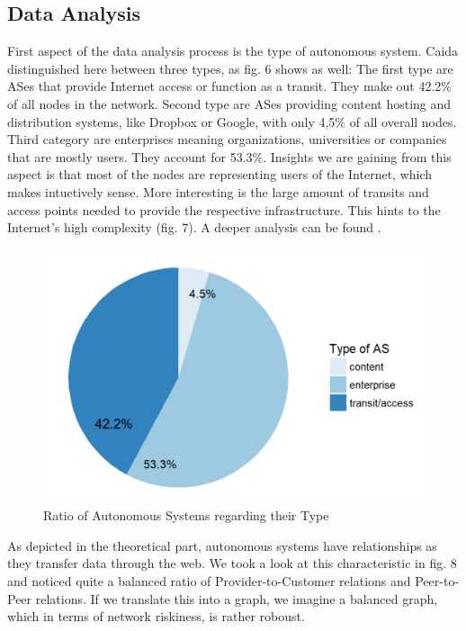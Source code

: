 \documentclass[conference, 11pt]{IEEEtran}
\begin{document}
\subsection{Data Analysis}
First aspect of the data analysis process is the type of autonomous system. Caida distinguished here between three types, as fig. 6 shows as well: The first type are ASes that provide Internet access or function as a transit. They make out 42.2\% of all nodes in the network. Second type are ASes providing content hosting and distribution systems, like Dropbox or Google, with only 4,5\% of all overall nodes. Third category are enterprises meaning organizations, universities or companies that are mostly users. They account for 53.3\%. Insights we are gaining from this aspect is that most of the nodes are representing users of the Internet, which makes intuetively sense. More interesting is the large amount of transits and access points needed to provide the respective infrastructure. This hints to the Internet's high complexity (fig. 7). A deeper analysis can be found \cite{runningTheWeb}.

\vspace{0.5cm}
\begin{figure}[htbp]
\centerline{\includegraphics[scale=0.4]{Graphics/typeofAS.PNG}}
\caption{Ratio of Autonomous Systems regarding their Type }
\label{fig}
\end{figure}
\vspace{0.5cm}

As depicted in the theoretical part, autonomous systems have relationships as they transfer data through the web. We took a look at this characteristic in fig. 8 and noticed quite a balanced ratio of Provider-to-Customer relations and Peer-to-Peer relations. If we translate this into a graph, we imagine a balanced graph, which in terms of network riskiness, is rather roboust. 
\end{document}
